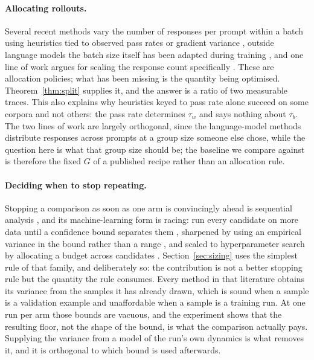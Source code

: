 \paragraph{Allocating rollouts.} Several recent methods vary the number of responses per prompt
within a batch using heuristics tied to observed pass rates or gradient variance
\citep{nguyen2026allocation}, outside language models the batch size itself has been adapted
during training \citep{park2026batchscaling}, and one line of work argues for scaling the response count
specifically \citep{hu2025brorl}. These are allocation policies; what has been missing is the
quantity being optimised. Theorem~\ref{thm:split} supplies it, and the answer is a ratio of two measurable traces. This
also explains why heuristics keyed to pass rate alone succeed on some corpora and not others:
the pass rate determines $\tau_w$ and says nothing about $\tau_b$. The two lines of work are
largely orthogonal, since the language-model methods distribute responses across prompts at a group size
someone else chose, while the question here is what that group size should be; the baseline we
compare against is therefore the fixed $G$ of a published recipe rather than an allocation rule.

\paragraph{Deciding when to stop repeating.} Stopping a comparison as soon as one arm is
convincingly ahead is sequential analysis \citep{wald1945sequential}, and its machine-learning form
is racing: run every candidate on more data until a confidence bound separates them
\citep{maron1993hoeffding, evendar2006action}, sharpened by using an empirical variance in the
bound rather than a range \citep{audibert2009exploration}, and scaled to hyperparameter search by
allocating a budget across candidates \citep{li2017hyperband}. Section~\ref{sec:sizing} uses the
simplest rule of that family, and deliberately so: the contribution is not a better stopping rule
but the quantity the rule consumes. Every method in that literature obtains its variance from the
samples it has already drawn, which is sound when a sample is a validation example and unaffordable
when a sample is a training run. At one run per arm those bounds are vacuous, and the experiment
shows that the resulting floor, not the shape of the bound, is what the comparison actually pays.
Supplying the variance from a model of the run's own dynamics is what removes it, and it is
orthogonal to which bound is used afterwards.

